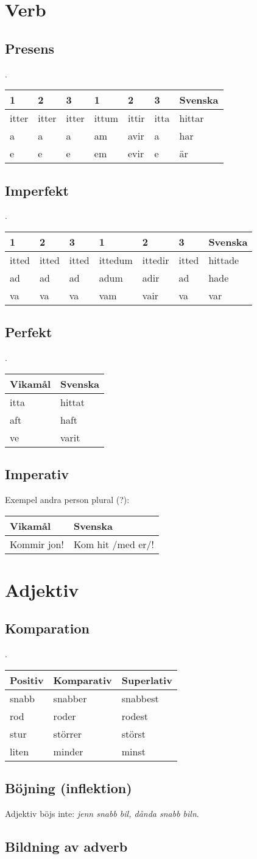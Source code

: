 \documentclass[a4paper]{memoir}
\newcommand{\eline}{\\[\baselineskip]} %
\newenvironment{mytable}[2]
{
  \eline
  \begin{tabular}{#1}
  \hline #2\\ \hline
}
{ \end{tabular} }
\newcommand{\myheader}[1]{ \hline #1\\ \hline }
\newenvironment{wlistvisv} %
{ \begin{mytable}{ l l }{Vikamål & Svenska} }
{ \end{mytable} }
\newenvironment{wlistvcon} %
{ \begin{mytable}{ l l l l l l l }
  {
    1 & 2 & 3 & 1 & 2 & 3 & Svenska
  }
}
{ \end{mytable} }
\newenvironment{wlistinfl} %
{ \begin{mytable}{ l l l }{Positiv & Komparativ & Superlativ} }
{ \end{mytable} }
\begin{document}
    \chapter{Verb}
      \section{Presens}
        .
        \begin{wlistvcon}
          itter & itter & itter & ittum & ittir & itta & hittar\\
          a & a & a & am & avir & a & har\\
          e & e & e & em & evir & e & är\\
        \end{wlistvcon}
      \section{Imperfekt}
        .
        \begin{wlistvcon}
          itted & itted & itted & ittedum & ittedir & itted & hittade\\
          ad & ad & ad & adum & adir & ad & hade\\
          va & va & va & vam & vair & va & var\\
        \end{wlistvcon}
      \section{Perfekt}
        .
        \begin{wlistvisv}
          itta & hittat\\
          aft & haft\\
          ve & varit\\
        \end{wlistvisv}
      \section{Imperativ}
        Exempel andra person plural (?):
        \begin{wlistvisv}
          Kommir jon! & Kom hit /med er/!\\
        \end{wlistvisv}
    \chapter{Adjektiv}
      \section{Komparation}
        .
        \begin{wlistinfl}
          snabb & snabber & snabbest\\
          rod & roder & rodest\\
          stur & störrer & störst\\
          liten & minder & minst\\
        \end{wlistinfl}
      \section{Böjning (inflektion)}
        Adjektiv böjs inte: \emph{jenn snabb bil, dånda snabb biln}.
      \section{Bildning av adverb}
\end{document}
